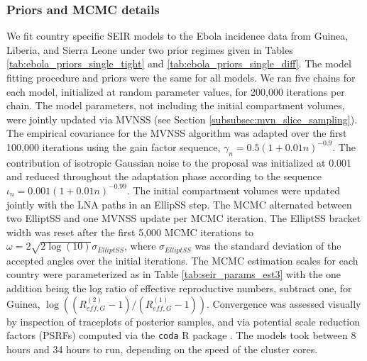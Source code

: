 \subsubsection{Priors and MCMC details}
\label{subsubsec:ebola_single_mcmc}

We fit country specific SEIR models to the Ebola incidence data from Guinea, Liberia, and Sierra Leone under two prior regimes given in Tables \ref{tab:ebola_priors_single_tight} and \ref{tab:ebola_priors_single_diff}. The model fitting procedure and priors were the same for all models. We ran five chains for each model, initialized at random parameter values, for 200,000 iterations per chain. The model parameters, not including the initial compartment volumes, were jointly updated via MVNSS (see Section \ref{subsubsec:mvn_slice_sampling}). The empirical covariance for the MVNSS algorithm was adapted over the first 100,000 iterations using the gain factor sequence, $\gamma_n = 0.5(1 + 0.01n)^{-0.9}$. The contribution of isotropic Gaussian noise to the proposal was initialized at 0.001 and reduced throughout the adaptation phase according to the sequence $ \iota_n = 0.001(1 + 0.01n)^{-0.99} $. The initial compartment volumes were updated jointly with the LNA paths in an EllipSS step. The MCMC alternated between two ElliptSS and one MVNSS update per MCMC iteration. The ElliptSS bracket width was reset after the first 5,000 MCMC iterations to $ \omega = 2\sqrt{2\log(10)}\sigma_{ElliptSS}$, where $ \sigma_{ElliptSS} $ was the standard deviation of the accepted angles over the initial iterations. The MCMC estimation scales for each country were parameterized as in Table \ref{tab:seir_params_est3} with the one addition being the log ratio of effective reproductive numbers, subtract one, for Guinea, $ \log\left ((R_{eff,G}^{(2)}-1)/(R_{eff,G}^{(1)}-1)\right ) $. Convergence was assessed visually by inspection of traceplots of posterior samples, and via potential scale reduction factors (PSRFs) \cite{brooks1998general} computed via the \texttt{coda} R package \cite{codapackage}. The models took between 8 hours and 34 hours to run, depending on the speed of the cluster cores. 

